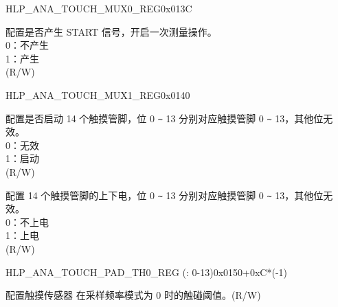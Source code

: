 \addtocounter{Regfloat}{-1}
\begin{register}{H}{LP\_ANA\_TOUCH\_MUX0\_REG}{0x013C}
\begin{regdesc}\begin{reglist}
\item [接上页...]

\label{fielddesc:LPANATOUCHSTARTFORCE}\item [LP\_ANA\_TOUCH\_START\_FORCE] 配置是否产生 START 信号，开启一次测量操作。\\
0：不产生\\
1：产生\\
(R/W)
\end{reglist}\end{regdesc}
\end{register}


\begin{register}{H}{LP\_ANA\_TOUCH\_MUX1\_REG}{0x0140}\label{regdesc:LPANATOUCHMUX1REG}
%
%
%
\regnewline%
\begin{regdesc}\begin{reglist}
\label{fielddesc:LPANATOUCHSTART}\item [LP\_ANA\_TOUCH\_START] 配置是否启动 14 个触摸管脚，位 0 \verb+~+ 13 分别对应触摸管脚 0 \verb+~+ 13，其他位无效。\\
0：无效\\
1：启动\\
(R/W)
\label{fielddesc:LPANATOUCHXPD}\item [LP\_ANA\_TOUCH\_XPD] 配置 14 个触摸管脚的上下电，位 0 \verb+~+ 13 分别对应触摸管脚 0 \verb+~+ 13，其他位无效。\\
0：不上电\\
1：上电\\
(R/W)
\end{reglist}\end{regdesc}
\end{register}


\begin{register}{H}{LP\_ANA\_TOUCH\_PAD\_TH0\_REG (: 0-13)}{0x0150+0xC*(-1)}\label{regdesc:LPANATOUCHPAD0TH0REG}
%
%
\regnewline%
\begin{regdesc}\begin{reglist}
\label{fielddesc:LPANATOUCHPAD0TH0}\item [LP\_ANA\_TOUCH\_PAD\regindex{n}\_TH0] 配置触摸传感器  在采样频率模式为 0 时的触碰阈值。(R/W)
\end{reglist}\end{regdesc}
\end{register}


